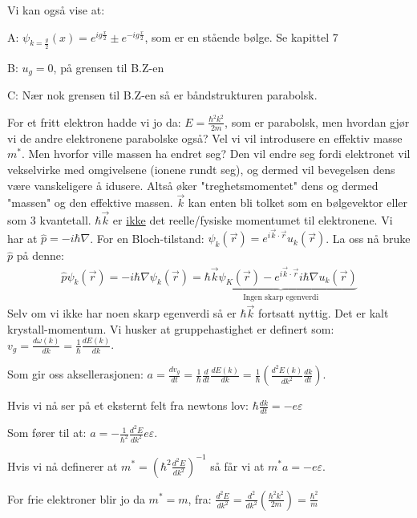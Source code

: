 \documentclass{article}
\begin{document}
Vi kan også vise at: 

A: $\psi_{k = \frac{g}{2}}(x) = e^{i g \frac{x}{2}} \pm e^{-ig\frac{x}{2}}$, som er en stående bølge. Se kapittel 7

B: $u_g = 0$, på grensen til B.Z-en

C: Nær nok grensen til B.Z-en så er båndstrukturen parabolsk.

For et fritt elektron hadde vi jo da: $E = \frac{\hbar^2 k^2}{2m}$, som er parabolsk, men hvordan gjør vi de andre elektronene parabolske også? Vel vi vil introdusere en effektiv masse $m^*$. Men hvorfor ville massen ha endret seg? Den vil endre seg fordi elektronet vil vekselvirke med omgivelsene (ionene rundt seg), og dermed vil bevegelsen dens være vanskeligere å idusere. Altså øker "treghetsmomentet" dens og dermed "massen" og den effektive massen.
$\vec{k}$ kan enten bli tolket som en bølgevektor eller som 3 kvantetall. $\hbar\vec{k}$ er \underline{ikke} det reelle/fysiske momentumet til elektronene. Vi har at $\hat{p} = -i \hbar \nabla$. For en Bloch-tilstand: $\psi_k(\vec{r}) = e^{i \vec{k} \cdot \vec{r}} u_k(\vec{r})$. La oss nå bruke $\hat{p}$ på denne:
\begin{align*}
  \hat{p} \psi_k(\vec{r}) = -i \hbar \nabla \psi_k(\vec{r}) = \underbrace{\hbar \vec{k} \psi_K (\vec{r}) - e^{i \vec{k} \cdot \vec{r}} i \hbar \nabla u_k(\vec{r})}_{\text{Ingen skarp egenverdi}}
\end{align*}
Selv om vi ikke har noen skarp egenverdi så er $\hbar \vec{k}$ fortsatt nyttig. Det er kalt krystall-momentum.
Vi husker at gruppehastighet er definert som: $v_g = \frac{d \omega(k)}{dk} = \frac{1}{\hbar} \frac{dE(k)}{dk}$.

Som gir oss aksellerasjonen: $a = \frac{d v_g}{dt} = \frac{1}{\hbar} \frac{d}{dt} \frac{dE(k)}{dk} = \frac{1}{\hbar}\left (\frac{d^2 E(k)}{dk^2} \frac{dk}{dt}\right)$.

Hvis vi nå ser på et eksternt felt fra newtons lov: $\hbar \frac{dk}{dt} = -e \varepsilon$

Som fører til at: $a = -\frac{1}{\hbar^2} \frac{d^2 E}{dk^2} e \varepsilon$.

Hvis vi nå definerer at $m^* = \left(\hbar^2 \frac{d^2 E}{dk^2}\right)^{-1}$ så får vi at $m^*a=-e\varepsilon$.

For frie elektroner blir jo da $m^* = m$, fra: $\frac{d^2 E}{dk^2} = \frac{d^2}{dk^2} \left(\frac{\hbar^2 k^2}{2m}\right) = \frac{\hbar^2}{m}$
\end{document}
